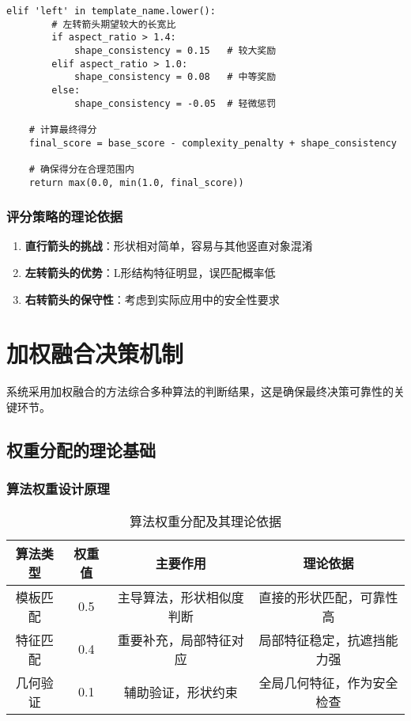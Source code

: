 \documentclass[12pt]{article}
\begin{document}
\begin{lstlisting}[caption=差异化评分策略实现]
    elif 'left' in template_name.lower():
        # 左转箭头期望较大的长宽比
        if aspect_ratio > 1.4:
            shape_consistency = 0.15   # 较大奖励
        elif aspect_ratio > 1.0:
            shape_consistency = 0.08   # 中等奖励
        else:
            shape_consistency = -0.05  # 轻微惩罚
    
    # 计算最终得分
    final_score = base_score - complexity_penalty + shape_consistency
    
    # 确保得分在合理范围内
    return max(0.0, min(1.0, final_score))
\end{lstlisting}

\subsubsection{评分策略的理论依据}

\begin{enumerate}
    \item \textbf{直行箭头的挑战}：形状相对简单，容易与其他竖直对象混淆
    \item \textbf{左转箭头的优势}：L形结构特征明显，误匹配概率低
    \item \textbf{右转箭头的保守性}：考虑到实际应用中的安全性要求
\end{enumerate}

\section{加权融合决策机制}

系统采用加权融合的方法综合多种算法的判断结果，这是确保最终决策可靠性的关键环节。

\subsection{权重分配的理论基础}

\subsubsection{算法权重设计原理}

\begin{table}[H]
\centering
\caption{算法权重分配及其理论依据}
\begin{tabular}{|c|c|c|c|}
\hline
\textbf{算法类型} & \textbf{权重值} & \textbf{主要作用} & \textbf{理论依据} \\
\hline
模板匹配 & 0.5 & 主导算法，形状相似度判断 & 直接的形状匹配，可靠性高 \\
\hline
特征匹配 & 0.4 & 重要补充，局部特征对应 & 局部特征稳定，抗遮挡能力强 \\
\hline
几何验证 & 0.1 & 辅助验证，形状约束 & 全局几何特征，作为安全检查 \\
\hline
\end{tabular}
\end{table}
\end{document}
